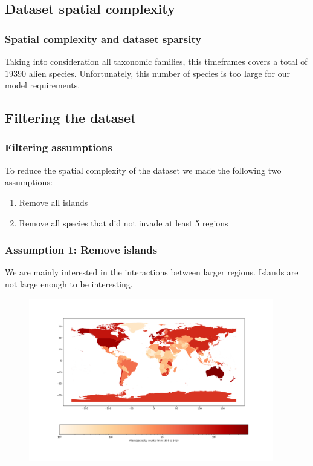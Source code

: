 \documentclass[
	11pt, %
]{beamer}
\begin{document}
\subsection{Dataset spatial complexity}
\begin{frame}
	\frametitle{Spatial complexity and dataset sparsity}
	Taking into consideration all taxonomic families, this timeframes covers a total of $19390$ alien species. Unfortunately, this number of species is too large for our model requirements.

\end{frame}

\subsection{Filtering the dataset}
\begin{frame}
	\frametitle{Filtering assumptions}
	To reduce the spatial complexity of the dataset we made the following two assumptions:
	\begin{enumerate}
	\item Remove all islands
	\item Remove all species that did not invade at least 5 regions
	\end{enumerate}
\end{frame}

\begin{frame}
\frametitle{Assumption 1: Remove islands}
We are mainly interested in the interactions between larger regions. Islands are not large enough to be interesting. 

\begin{figure}[H]
    \centering
    \includegraphics[width=0.95\textwidth]{region_invasion.png}
\end{figure}

\end{frame}
\end{document}
